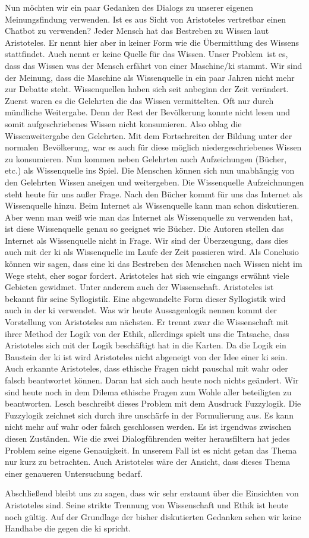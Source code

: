 Nun möchten wir ein paar Gedanken des Dialogs zu unserer eigenen Meinungsfindung verwenden. Ist es aus Sicht von Aristoteles vertretbar einen Chatbot zu verwenden? Jeder Mensch hat das Bestreben zu Wissen laut Aristoteles. Er nennt hier aber in keiner Form wie die Übermittlung des Wissens stattfindet. Auch nennt er keine Quelle für das Wissen. Unser \glqq Problem\grqq\ ist es, dass das Wissen was der Mensch erfährt von einer Maschine/\ac{ki} stammt. Wir sind der Meinung, dass die Maschine als Wissenquelle in ein paar Jahren nicht mehr zur Debatte steht. Wissenquellen haben sich seit anbeginn der Zeit verändert. Zuerst waren es die Gelehrten die das Wissen vermittelten. Oft nur durch mündliche Weitergabe. Denn der Rest der Bevölkerung konnte nicht lesen und somit aufgeschriebenes Wissen nicht konsumieren. Also oblag die Wissenweitergabe den Gelehrten. Mit dem Fortschreiten der Bildung unter der \glqq normalen\grqq\ Bevölkerung, war es auch für diese möglich niedergeschriebenes Wissen zu konsumieren. Nun kommen neben Gelehrten auch Aufzeichungen (Bücher, etc.) als Wissenquelle ins Spiel. Die Menschen können sich nun unabhängig von den Gelehrten Wissen aneigen und weitergeben. Die Wissenquelle Aufzeichnungen steht heute für uns außer Frage. Nach den Bücher kommt für uns das Internet als Wissenquelle hinzu. Beim Internet als Wissenquelle kann man schon diskutieren. Aber wenn man weiß wie man das Internet als Wissenquelle zu verwenden hat, ist diese Wissenquelle genau so geeignet wie Bücher. Die Autoren stellen das Internet als Wissenquelle nicht in Frage. Wir sind der Überzeugung, dass dies auch mit der \ac{ki} als Wissenquelle im Laufe der Zeit passieren wird. Als Conclusio können wir sagen, dass eine \ac{ki} das Bestreben des Menschen nach Wissen nicht im Wege steht, eher sogar fordert. \newline
Aristoteles hat sich wie eingangs erwähnt viele Gebieten gewidmet. Unter anderem auch der Wissenschaft. Aristoteles ist bekannt für seine Syllogistik. Eine abgewandelte Form dieser Syllogistik wird auch in der \ac{ki} verwendet. Was wir heute Aussagenlogik nennen kommt der Vorstellung von Aristoteles am nächsten. Er trennt zwar die Wissenschaft mit ihrer Method der Logik von der Ethik, allerdings spielt uns die Tatsache, dass Aristoteles sich mit der Logik beschäftigt hat in die Karten. Da die Logik ein Baustein der \ac{ki} ist wird Aristoteles nicht abgeneigt von der Idee einer \ac{ki} sein. \newline
Auch erkannte Aristoteles, dass ethische Fragen nicht pauschal mit wahr oder falsch beantwortet können. Daran hat sich auch heute noch nichts geändert. Wir sind heute noch in dem Dilema ethische Fragen zum Wohle aller beteiligten zu beantworten. Lesch beschreibt dieses Problem mit dem Ausdruck Fuzzylogik. Die Fuzzylogik zeichnet sich durch ihre unschärfe in der Formulierung aus. Es kann nicht mehr auf wahr oder falsch geschlossen werden. Es ist irgendwas zwischen diesen Zuständen. \newline
Wie die zwei Dialogführenden weiter herausfiltern hat jedes Problem seine eigene Genauigkeit. In unserem Fall ist es nicht getan das Thema nur kurz zu betrachten. Auch Aristoteles wäre der Ansicht, dass dieses Thema einer genaueren Untersuchung bedarf.

Abschließend bleibt uns zu sagen, dass wir sehr erstaunt über die Einsichten von Aristoteles sind. Seine strikte Trennung von Wissenschaft und Ethik ist heute noch gültig. Auf der Grundlage der bisher diskutierten Gedanken sehen wir keine Handhabe die gegen die \ac{ki} spricht. 


